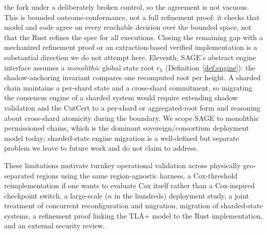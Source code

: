\documentclass[journal]{IEEEtran}
\theoremstyle{definition}
\theoremstyle{remark}
\begin{document}
the fork under a deliberately broken control, so the agreement is not vacuous. This is bounded
outcome-conformance, not a full refinement proof: it checks that model and code agree on every
reachable decision over the bounded space, not that the Rust refines the spec for all executions.
Closing the remaining gap with a mechanized refinement proof or an extraction-based verified
implementation is a substantial direction we do not attempt here. Eleventh, SAGE's abstract engine interface assumes a
\emph{monolithic} global state root $r_h$ (Definition~\ref{def:engine}): the shadow-anchoring
invariant compares one recomputed root per height. A sharded chain maintains a per-shard state and
a cross-shard commitment, so migrating the consensus engine of a sharded system would require
extending shadow validation and the CutCert to a per-shard or aggregated-root form and reasoning
about cross-shard atomicity during the boundary. We scope SAGE to monolithic permissioned chains,
which is the dominant sovereign/consortium deployment model today; sharded-state engine migration
is a well-defined but separate problem we leave to future work and do not claim to address.

These limitations
motivate turnkey operational validation across physically geo-separated regions using the same
region-agnostic harness, a Cox-threshold reimplementation if one wants to evaluate Cox itself rather
than a Cox-inspired checkpoint switch, a large-scale ($n$ in the hundreds) deployment study, a
joint treatment of concurrent reconfiguration and migration, migration of sharded-state systems, a
refinement proof linking the TLA+ model to the Rust implementation, and an external security
review.

\end{document}
